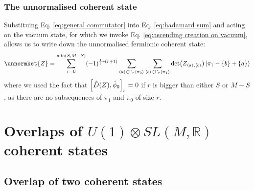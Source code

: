 \documentclass[12pt]{article}
\newcommand{\seq}[1]{\langle #1\rangle}
\begin{document}
	\subsubsection{The unnormalised coherent state}
	Substituing Eq. \ref{eq:general commutator} into Eq. \ref{eq:hadamard sum} and acting on the vacuum state, for which we invoke Eq. \ref{eq:ascending creation on vacuum}, allows us to write down the unnormalised fermionic coherent state:
	\begin{equation}\label{eq:unnormalised coherent state}
	\unnormket{Z}=\sum_{r=0}^{\min(S,M-S)}(-1)^{\frac{1}{2}r(r+1)}\sum_{\seq{a}\in\Gamma_r\seq{\pi_0}}\sum_{\seq{b}\in\Gamma_r\seq{\pi_1}}\det(Z_{\seq{a},\seq{b}})\ket{\pi_1-\{b\}+\{a\}}
	\end{equation}
	where we used the fact that $\comm{\hat{D}(Z)}{\hat{\phi}_0}_r=0$ if $r$ is bigger than either $S$ or $M-S$, as there are no subsequences of $\pi_1$ and $\pi_0$ of size $r$.
	
	\section{Overlaps of $U(1)\otimes SL(M,\mathbb{R})$ coherent states} \label{sec:overlaps}
	
	\subsection{Overlap of two coherent states}
	
\end{document}
